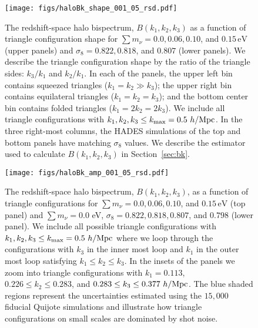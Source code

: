 \documentclass[12pt, letterpaper, preprint]{aastex62}
\newcommand{\smnu}{\sum m_\nu}
\newcommand{\sig}{\sigma_8}
\begin{document}
\begin{figure}
\begin{center}
    \texttt{[image: figs/haloBk\_shape\_001\_05\_rsd.pdf]} 
    \caption{The redshift-space halo bispectrum, $B(k_1, k_2, k_3)$ as a 
    function of triangle configuration shape for $\smnu = 0.0, 0.06, 0.10$, 
    and $0.15\,\mathrm{eV}$ (upper panels) and $\sig = 0.822, 0.818$, and 
    $0.807$ (lower panels). We describe the triangle configuration shape 
    by the ratio of the triangle sides: $k_3/k_1$ and $k_2/k_1$. In each 
    of the panels, the upper left bin contains squeezed triangles 
    ($k_1 = k_2 \gg k_3$); the upper right bin contains equilateral triangles 
    ($k_1 = k_2 = k_3$); and the bottom center bin contains folded triangles 
    ($k_1 = 2 k_2 = 2 k_3$). We include all triangle configurations with 
    $k_1, k_2, k_3 \leq k_{\rm max} = 0.5~h/{\rm Mpc}$. In the three 
    right-most columns, the HADES simulations of the top and bottom panels 
    have matching $\sig$ values. We describe the estimator used to calculate 
    $B(k_1, k_2, k_3)$ in Section~\ref{sec:bk}.}
\label{fig:bk_shape}
\end{center}
\end{figure}

\begin{figure}
\begin{center}
\texttt{[image: figs/haloBk\_amp\_001\_05\_rsd.pdf]}
    \caption{The redshift-space halo bispectrum, $B(k_1, k_2, k_3)$, as a
    function of triangle configurations for $\smnu = 0.0, 0.06, 0.10$, 
    and $0.15\,\mathrm{eV}$ (top panel) and $\smnu = 0.0$ eV, $\sig = 0.822, 0.818, 0.807$, 
    and $0.798$ (lower panel). We include all possible triangle configurations 
    with $k_1, k_2, k_3 \leq k_{\rm max} = 0.5~h/{\rm Mpc}$ where we loop 
    through the configurations with $k_3$ in the inner most loop and 
    $k_1$ in the outer most loop satisfying $k_1 \leq k_2 \leq k_3$. In the 
    insets of the panels we zoom into triangle configurations with 
    $k_1 = 0.113$, $0.226 \leq k_2 \leq 0.283$, and $0.283 \leq k_3 \leq 0.377~h/{\rm Mpc}$. 
    The blue shaded regions represent the uncertainties estimated using 
    the $15,000$ fiducial Quijote simulations and illustrate how triangle 
    configurations on small scales are dominated by shot noise.}
\label{fig:bk_amp}
\end{center}
\end{figure}

\end{document}
